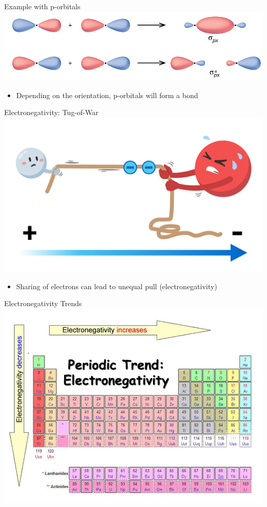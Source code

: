 \documentclass[11pt]{beamer}
\begin{document}
\begin{frame}{Example with p-orbitals}
  \centering
  \includegraphics[width=\linewidth]{p_sigma}
  \begin{itemize}
  \item Depending on the orientation, p-orbitals
    will form a bond
  \end{itemize}
\end{frame}

\begin{frame}{Electronegativity: Tug-of-War}
  \centering
  \includegraphics[width=0.8\linewidth]{water_tug}
  \begin{itemize}
  \item Sharing of electrons can lead to unequal pull
    (electronegativity)
  \end{itemize}
\end{frame}

\begin{frame}{Electronegativity Trends}
  \centering
  \includegraphics[width=\linewidth]{electronegativity}
\end{frame}
\end{document}

